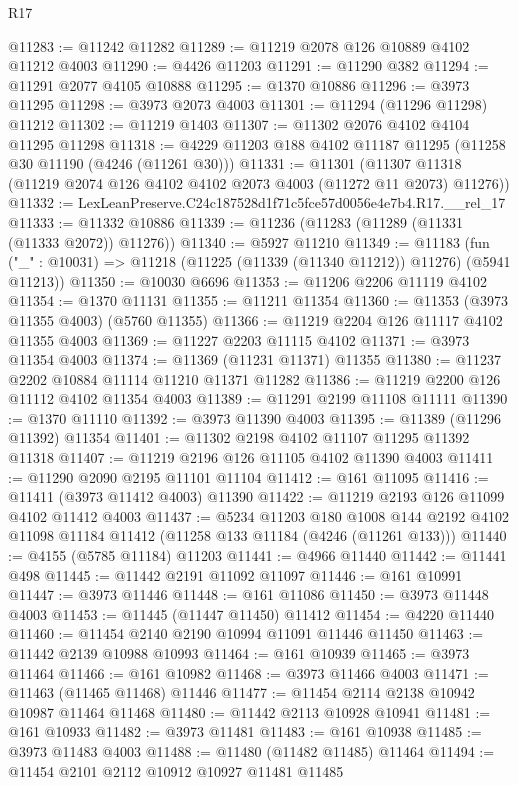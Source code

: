 \begin{lexlean}{R17}
\begin{coremodule}
@11283 := @11242 @11282
@11289 := @11219 @2078 @126 @10889 @4102 @11212 @4003
@11290 := @4426 @11203
@11291 := @11290 @382
@11294 := @11291 @2077 @4105 @10888
@11295 := @1370 @10886
@11296 := @3973 @11295
@11298 := @3973 @2073 @4003
@11301 := @11294 (@11296 @11298) @11212
@11302 := @11219 @1403
@11307 := @11302 @2076 @4102 @4104 @11295 @11298
@11318 := @4229 @11203 @188 @4102 @11187 @11295 (@11258 @30 @11190 (@4246 (@11261 @30)))
@11331 := @11301
    (@11307 @11318 (@11219 @2074 @126 @4102 @4102 @2073 @4003 (@11272 @11 @2073) @11276))
@11332 := LexLeanPreserve.C24c187528d1f71c5fce57d0056e4e7b4.R17.__rel_17
@11333 := @11332 @10886
@11339 := @11236 (@11283 (@11289 (@11331 (@11333 @2072)) @11276))
@11340 := @5927 @11210
@11349 := @11183
    (fun ("_" : @10031) => @11218 (@11225 (@11339 (@11340 @11212)) @11276) (@5941 @11213))
@11350 := @10030 @6696
@11353 := @11206 @2206 @11119 @4102
@11354 := @1370 @11131
@11355 := @11211 @11354
@11360 := @11353 (@3973 @11355 @4003) (@5760 @11355)
@11366 := @11219 @2204 @126 @11117 @4102 @11355 @4003
@11369 := @11227 @2203 @11115 @4102
@11371 := @3973 @11354 @4003
@11374 := @11369 (@11231 @11371) @11355
@11380 := @11237 @2202 @10884 @11114 @11210 @11371 @11282
@11386 := @11219 @2200 @126 @11112 @4102 @11354 @4003
@11389 := @11291 @2199 @11108 @11111
@11390 := @1370 @11110
@11392 := @3973 @11390 @4003
@11395 := @11389 (@11296 @11392) @11354
@11401 := @11302 @2198 @4102 @11107 @11295 @11392 @11318
@11407 := @11219 @2196 @126 @11105 @4102 @11390 @4003
@11411 := @11290 @2090 @2195 @11101 @11104
@11412 := @161 @11095
@11416 := @11411 (@3973 @11412 @4003) @11390
@11422 := @11219 @2193 @126 @11099 @4102 @11412 @4003
@11437 := @5234
    @11203
    @180
    @1008
    @144
    @2192
    @4102
    @11098
    @11184
    @11412
    (@11258 @133 @11184 (@4246 (@11261 @133)))
@11440 := @4155 (@5785 @11184) @11203
@11441 := @4966 @11440
@11442 := @11441 @498
@11445 := @11442 @2191 @11092 @11097
@11446 := @161 @10991
@11447 := @3973 @11446
@11448 := @161 @11086
@11450 := @3973 @11448 @4003
@11453 := @11445 (@11447 @11450) @11412
@11454 := @4220 @11440
@11460 := @11454 @2140 @2190 @10994 @11091 @11446 @11450
@11463 := @11442 @2139 @10988 @10993
@11464 := @161 @10939
@11465 := @3973 @11464
@11466 := @161 @10982
@11468 := @3973 @11466 @4003
@11471 := @11463 (@11465 @11468) @11446
@11477 := @11454 @2114 @2138 @10942 @10987 @11464 @11468
@11480 := @11442 @2113 @10928 @10941
@11481 := @161 @10933
@11482 := @3973 @11481
@11483 := @161 @10938
@11485 := @3973 @11483 @4003
@11488 := @11480 (@11482 @11485) @11464
@11494 := @11454 @2101 @2112 @10912 @10927 @11481 @11485

\end{coremodule}
\end{lexlean}
